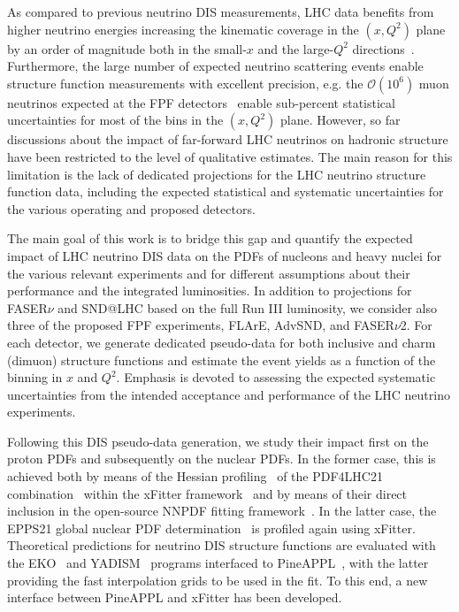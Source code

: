 As compared to previous neutrino DIS measurements,  LHC data benefits
from higher neutrino energies  increasing the kinematic coverage
in the $(x,Q^2)$ plane by an order of magnitude both in the small-$x$
and the large-$Q^2$ directions~\cite{Feng:2022inv}.
%
Furthermore, the large number of expected neutrino scattering events enable
structure function measurements with excellent precision,
e.g. the  $\mathcal{O}(10^6)$ muon neutrinos expected at the FPF detectors~\cite{Kling:2021gos}
enable sub-percent statistical uncertainties for most of the bins in the $(x,Q^2)$ plane.
%
However,  so far discussions about the impact of far-forward LHC neutrinos on hadronic structure
have been restricted to the level  of qualitative estimates.
%
The main reason for this limitation is the lack
of dedicated projections for the LHC neutrino structure function data, including the expected
statistical and systematic uncertainties for the various operating and proposed detectors.

The main goal of this work is to bridge this gap and quantify
the expected impact of LHC neutrino DIS data on the PDFs of  nucleons and heavy nuclei
for the various relevant experiments and for different assumptions about their performance
and the integrated luminosities.
%
In addition to projections for FASER$\nu$ and SND@LHC based on the full Run III luminosity,
we consider also three of the proposed FPF experiments, FLArE, AdvSND, and FASER$\nu$2.
%
For each detector, we generate dedicated  pseudo-data for both inclusive and charm (dimuon)
structure functions and estimate the event yields as a function of the binning
in $x$ and $Q^2$.
%
Emphasis is devoted to assessing the expected systematic uncertainties
from the intended acceptance and performance of the LHC neutrino experiments.

Following this DIS pseudo-data generation, we study their impact first
on the proton PDFs and subsequently on the nuclear PDFs.
%
In the former case, this is achieved both by means of the Hessian profiling~\cite{Paukkunen:2014zia}
of the PDF4LHC21 combination~\cite{PDF4LHCWorkingGroup:2022cjn}
within the  {\sc\small xFitter} framework~\cite{Alekhin:2014irh} and by means
of their direct inclusion in the open-source NNPDF fitting framework~\cite{NNPDF:2021uiq}.
%
In the latter case, the EPPS21 global nuclear PDF determination~\cite{Eskola:2021nhw}
is profiled again using {\sc\small xFitter}.
%
Theoretical predictions for neutrino DIS structure functions are evaluated with the {\sc\small EKO}~\cite{Candido:2022tld}
and {\sc\small YADISM}~\cite{yadism,Candido:2023utz} programs interfaced to {\sc\small PineAPPL}~\cite{Carrazza:2020gss}, with the latter providing the fast interpolation grids to be used in the fit.
%
To this end, a new interface between  {\sc\small PineAPPL} and {\sc\small xFitter} has been developed.

